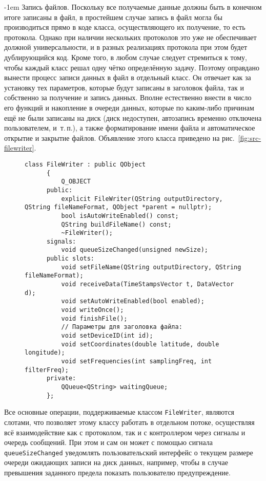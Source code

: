 \documentclass[a4paper, 14pt, titlepage]{extarticle}
\makeatletter
\newcommand{\inlinecode}[1]{\lstinline[basicstyle=\ttfamily]{#1}}
\newenvironment{myfigure}[2]%
    {\pushQED{\caption{#1} \label{#2}} %
     \begin{figure}[!htb]\centering } %
    {  \popQED %
     \end{figure}}
\renewcommand{\paragraph}{%
    \@startsection{paragraph}{4}%
    {\parindent}{\z@}{-1em}%
    {\normalfont\normalsize\bfseries}%
  }
\makeatother
\begin{document}
  \paragraph{Запись файлов.}
  Поскольку все получаемые данные должны быть в конечном итоге записаны в файл, в простейшем случае
  запись в файл могла бы производиться прямо в коде класса, осуществляющего их получение, то есть
  протокола. Однако при наличии нескольких протоколов это уже не обеспечивает должной
  универсальности, и в разных реализациях протокола при этом будет дублирующийся код. Кроме того, в
  любом случае следует стремиться к тому, чтобы каждый класс решал одну чётко определённую задачу.
  Поэтому оправдано вынести процесс записи данных в файл в отдельный класс.
  Он отвечает как за установку тех параметров, которые будут записаны в заголовок файла, так и
  собственно за получение и запись данных. Вполне естественно внести в число его функций и
  накопление в очереди данных, которые по каким-либо причинам ещё не были записаны на диск (диск
  недоступен, автозапись временно отключена пользователем, и~т.\,п.), а также форматирование имени
  файла и автоматическое открытие и закрытие файлов. Объявление этого класса приведено на
  рис.~\ref{fig:src-filewriter}.

  \begin{myfigure}{Класс, отвечающий за запись файлов}{fig:src-filewriter}
    \begin{lstlisting}[xleftmargin=7mm, xrightmargin=7mm]
      class FileWriter : public QObject
      {
          Q_OBJECT
      public:
          explicit FileWriter(QString outputDirectory, QString fileNameFormat, QObject *parent = nullptr);
          bool isAutoWriteEnabled() const;
          QString buildFileName() const;
          ~FileWriter();
      signals:
          void queueSizeChanged(unsigned newSize);
      public slots:
          void setFileName(QString outputDirectory, QString fileNameFormat);
          void receiveData(TimeStampsVector t, DataVector d);
          void setAutoWriteEnabled(bool enabled);
          void writeOnce();
          void finishFile();
          // Параметры для заголовка файла:
          void setDeviceID(int id);
          void setCoordinates(double latitude, double longitude);
          void setFrequencies(int samplingFreq, int filterFreq);
      private:
          QQueue<QString> waitingQueue;
      };
    \end{lstlisting}
  \end{myfigure}

  Все основные операции, поддерживаемые классом \inlinecode{FileWriter}, являются слотами, что
  позволяет этому классу работать в отдельном потоке, осуществляя всё взаимодействие как с
  протоколом, так и с контроллером через сигналы и очередь сообщений. При этом и сам он может с
  помощью сигнала \inlinecode{queueSizeChanged} уведомлять пользовательский интерфейс о текущем размере очереди ожидающих записи
  на диск данных, например, чтобы в случае превышения заданного предела показать пользователю предупреждение.
\end{document}
